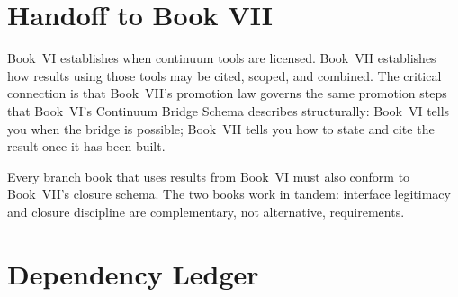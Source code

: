 \documentclass[12pt,oneside]{amsbook}
\theoremstyle{plain}
\theoremstyle{definition}
\theoremstyle{remark}
\begin{document}
\section{Handoff to Book VII}

Book~VI establishes when continuum tools are licensed.  Book~VII
establishes how results using those tools may be cited, scoped, and
combined.  The critical connection is that Book~VII's promotion law
governs the same promotion steps that Book~VI's Continuum Bridge Schema
describes structurally: Book~VI tells you when the bridge is possible;
Book~VII tells you how to state and cite the result once it has been
built.

Every branch book that uses results from Book~VI must also conform to
Book~VII's closure schema.  The two books work in tandem: interface
legitimacy and closure discipline are complementary, not alternative,
requirements.

\section{Dependency Ledger}
\end{document}
